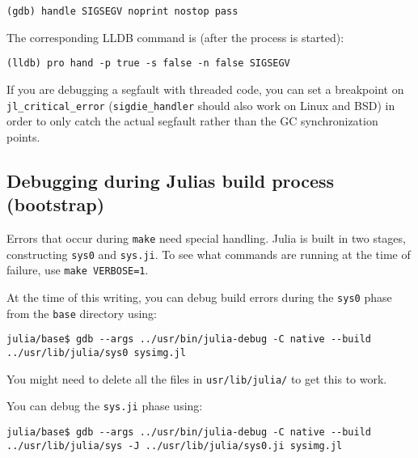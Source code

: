\begin{lstlisting}
(gdb) handle SIGSEGV noprint nostop pass
\end{lstlisting}



The corresponding LLDB command is (after the process is started):




\begin{lstlisting}
(lldb) pro hand -p true -s false -n false SIGSEGV
\end{lstlisting}



If you are debugging a segfault with threaded code, you can set a breakpoint on \texttt{jl\_critical\_error} (\texttt{sigdie\_handler} should also work on Linux and BSD) in order to only catch the actual segfault rather than the GC synchronization points.



\hypertarget{8144212274800572894}{}


\subsection{Debugging during Julia{\textquotesingle}s build process (bootstrap)}



Errors that occur during \texttt{make} need special handling. Julia is built in two stages, constructing \texttt{sys0} and \texttt{sys.ji}. To see what commands are running at the time of failure, use \texttt{make VERBOSE=1}.



At the time of this writing, you can debug build errors during the \texttt{sys0} phase from the \texttt{base} directory using:




\begin{lstlisting}
julia/base$ gdb --args ../usr/bin/julia-debug -C native --build ../usr/lib/julia/sys0 sysimg.jl
\end{lstlisting}



You might need to delete all the files in \texttt{usr/lib/julia/} to get this to work.



You can debug the \texttt{sys.ji} phase using:




\begin{lstlisting}
julia/base$ gdb --args ../usr/bin/julia-debug -C native --build ../usr/lib/julia/sys -J ../usr/lib/julia/sys0.ji sysimg.jl
\end{lstlisting}




